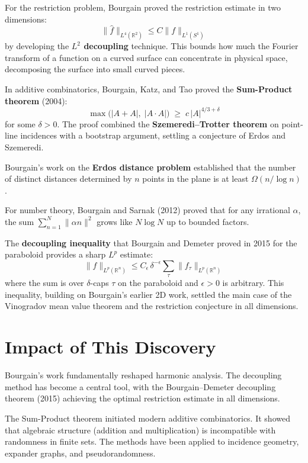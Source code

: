 For the restriction problem, Bourgain proved the restriction
estimate in two dimensions:
\[
  \|\widehat{f}\|_{L^4(\mathbb{R}^2)}
  \leq C \|f\|_{L^1(S^1)}
\]
by developing the \textbf{$L^2$ decoupling} technique.  This
bounds how much the Fourier transform of a function on a curved
surface can concentrate in physical space, decomposing the surface
into small curved pieces.

In additive combinatorics, Bourgain, Katz, and Tao proved the
\textbf{Sum-Product theorem} (2004):
\[
  \max\bigl(|A+A|,\;|A\cdot A|\bigr)
  \;\geq\; c\,|A|^{4/3+\delta}
\]
for some $\delta>0$.  The proof combined the
\textbf{Szemeredi--Trotter theorem} on point-line incidences with
a bootstrap argument, settling a conjecture of Erdos and Szemeredi.

Bourgain's work on the \textbf{Erdos distance problem} established
that the number of distinct distances determined by $n$ points in
the plane is at least $\Omega(n/\log n)$.

For number theory, Bourgain and Sarnak (2012) proved that for any
irrational $\alpha$, the sum
$\sum_{n=1}^{N}\|\alpha n\|^{2}$ grows like $N\log N$ up to
bounded factors.

The \textbf{decoupling inequality} that Bourgain and Demeter proved
in 2015 for the paraboloid provides a sharp $L^p$ estimate:
\[
  \|f\|_{L^p(\mathbb{R}^n)}
  \leq C_\epsilon\,\delta^{-\epsilon}
    \sum_{\tau} \|f_\tau\|_{L^p(\mathbb{R}^n)}
\]
where the sum is over $\delta$-caps $\tau$ on the paraboloid and
$\epsilon>0$ is arbitrary.  This inequality, building on
Bourgain's earlier 2D work, settled the main case of the
Vinogradov mean value theorem and the restriction conjecture in
all dimensions.

\section{Impact of This Discovery}

Bourgain's work fundamentally reshaped harmonic analysis.  The
decoupling method has become a central tool, with the
Bourgain--Demeter decoupling theorem (2015) achieving the optimal
restriction estimate in all dimensions.

The Sum-Product theorem initiated modern additive combinatorics.
It showed that algebraic structure (addition and multiplication) is
incompatible with randomness in finite sets.  The methods have been
applied to incidence geometry, expander graphs, and
pseudorandomness.

